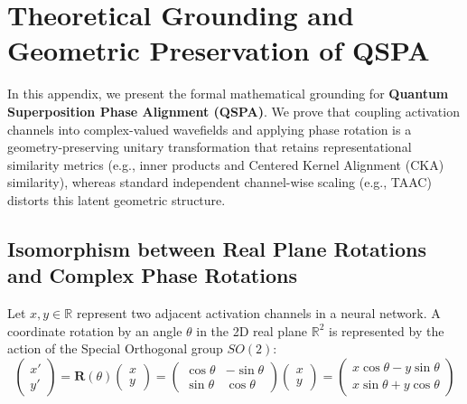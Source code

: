 \documentclass{article}
\begin{document}



\newpage
\appendix
\onecolumn

\section{Theoretical Grounding and Geometric Preservation of QSPA}
\label{appendix:theory}

In this appendix, we present the formal mathematical grounding for \textbf{Quantum Superposition Phase Alignment (QSPA)}. We prove that coupling activation channels into complex-valued wavefields and applying phase rotation is a geometry-preserving unitary transformation that retains representational similarity metrics (e.g., inner products and Centered Kernel Alignment (CKA) similarity), whereas standard independent channel-wise scaling (e.g., TAAC) distorts this latent geometric structure.

\subsection{Isomorphism between Real Plane Rotations and Complex Phase Rotations}
Let $x, y \in \mathbb{R}$ represent two adjacent activation channels in a neural network. A coordinate rotation by an angle $\theta$ in the 2D real plane $\mathbb{R}^2$ is represented by the action of the Special Orthogonal group $SO(2)$:
\begin{equation}
    \begin{pmatrix} x' \\ y' \end{pmatrix} = \mathbf{R}(\theta) \begin{pmatrix} x \\ y \end{pmatrix} = \begin{pmatrix} \cos\theta & -\sin\theta \\ \sin\theta & \cos\theta \end{pmatrix} \begin{pmatrix} x \\ y \end{pmatrix} = \begin{pmatrix} x \cos\theta - y \sin\theta \\ x \sin\theta + y \cos\theta \end{pmatrix}
\end{equation}
\end{document}
